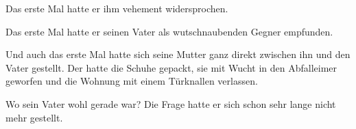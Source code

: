 Das erste Mal hatte er ihm vehement widersprochen.

Das erste Mal hatte er seinen Vater als wutschnaubenden Gegner
empfunden.

Und auch das erste Mal hatte sich seine Mutter ganz direkt zwischen ihn und
den Vater gestellt. Der hatte die Schuhe gepackt, sie mit Wucht in
den Abfalleimer geworfen und die Wohnung mit einem Türknallen verlassen.

\sectionbreak

Wo sein Vater wohl gerade war? Die Frage hatte er sich schon sehr lange
nicht mehr gestellt.
